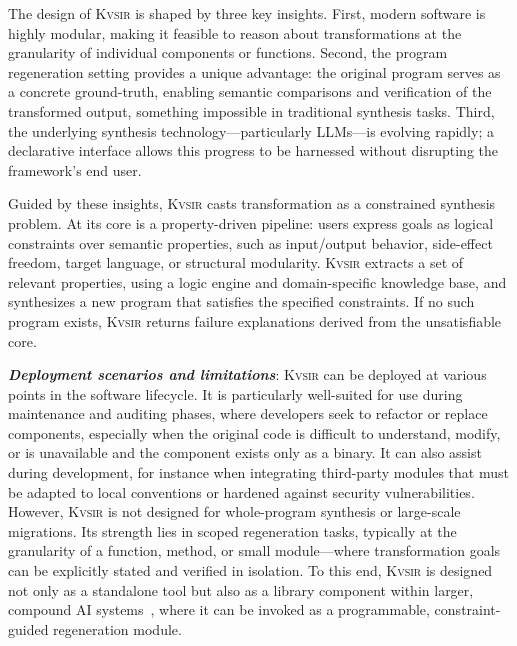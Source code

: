 \documentclass[sigplan]{acmart}
\newcommand{\sys}{{\scshape Kv{\textalpha}sir}\xspace}
\newcommand{\heading}[1]{\vspace{2pt}\noindent\textbf{\emph{#1}}:\enspace}
\begin{document}
The design of \sys is shaped by three key insights.
First, modern software is highly modular, making it feasible to reason about transformations at the granularity of individual components or functions.
Second, the program regeneration setting provides a unique advantage: the original program serves as a concrete ground-truth, enabling semantic comparisons and verification of the transformed output, something impossible in traditional synthesis tasks.
Third, the underlying synthesis technology---particularly LLMs---is evolving rapidly; a declarative interface allows this progress to be harnessed without disrupting the framework's end user.

Guided by these insights, \sys casts transformation as a constrained synthesis problem.
At its core is a property-driven pipeline: users express goals as logical constraints over semantic properties, such as input/output behavior, side-effect freedom, target language, or structural modularity.
\sys extracts a set of relevant properties, using a logic engine and domain-specific knowledge base, and synthesizes a new program that satisfies the specified constraints.
If no such program exists, \sys returns failure explanations derived from the unsatisfiable core.

\heading{Deployment scenarios and limitations}
\sys can be deployed at various points in the software lifecycle.
It is particularly well-suited for use during maintenance and auditing phases, where developers seek to refactor or replace components, especially when the original code is difficult to understand, modify, or is unavailable and the component exists only as a binary.
It can also assist during development, for instance when integrating third-party modules that must be adapted to local conventions or hardened against security vulnerabilities.
However, \sys is not designed for whole-program synthesis or large-scale migrations.
Its strength lies in scoped regeneration tasks, typically at the granularity of a function, method, or small module---where transformation goals can be explicitly stated and verified in isolation.
To this end, \sys is designed not only as a standalone tool but also as a library component within larger, compound AI systems~\cite{compound-ai-blog}, where it can be invoked as a programmable, constraint-guided regeneration module.

\end{document}
